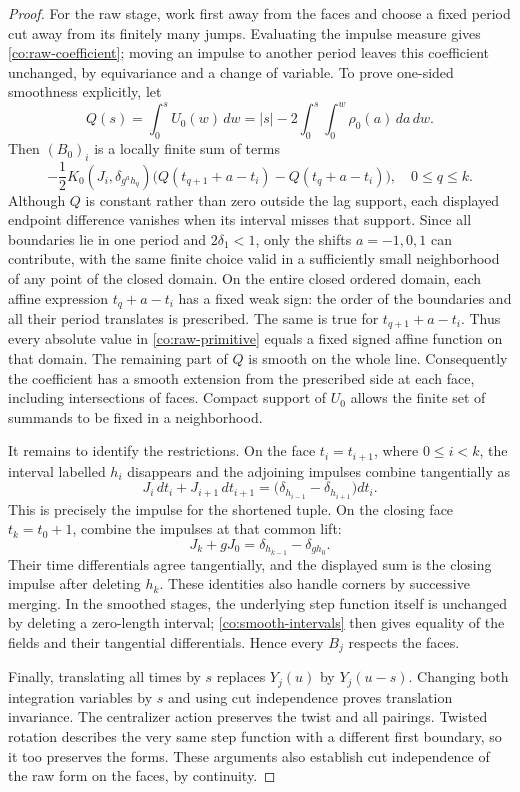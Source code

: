 \begin{proof}
For the raw stage, work first away from the faces and choose a fixed
period cut away from its finitely many jumps.  Evaluating the impulse
measure gives \eqref{co:raw-coefficient}; moving an impulse to another
period leaves this coefficient unchanged, by equivariance and a change
of variable.  To prove one-sided smoothness explicitly, let
\[
 Q(s)=\int_0^sU_0(w)\,dw
 =|s|-2\int_0^s\int_0^w\rho_0(a)\,da\,dw.
\]
Then $(B_0)_i$ is a locally finite sum of terms
\begin{equation}
 -\frac12K_0(J_i,\delta_{g^ah_q})
 \bigl(Q(t_{q+1}+a-t_i)-Q(t_q+a-t_i)\bigr),
 \quad 0\leq q\leq k.
 \label{co:raw-primitive}
\end{equation}
Although $Q$ is constant rather than zero outside the lag support, each
displayed endpoint difference vanishes when its interval misses that
support.  Since all boundaries lie in one period and $2\delta_1<1$, only
the shifts $a=-1,0,1$ can contribute, with the same finite choice valid
in a sufficiently small neighborhood of any point of the closed domain.
On the entire closed ordered domain, each affine expression
$t_q+a-t_i$ has a fixed weak sign: the order of the boundaries and all
their period translates is prescribed.  The same is true for
$t_{q+1}+a-t_i$.  Thus every absolute value in
\eqref{co:raw-primitive} equals a fixed signed affine function on that
domain.  The remaining part of $Q$ is smooth on the whole line.
Consequently the coefficient has a smooth extension from the prescribed
side at each face, including intersections of faces.  Compact support of
$U_0$ allows the finite set of summands to be fixed in a neighborhood.

It remains to identify the restrictions.  On the face $t_i=t_{i+1}$,
where $0\leq i<k$, the interval labelled $h_i$ disappears and the
adjoining impulses combine tangentially as
\[
 J_i\,dt_i+J_{i+1}\,dt_{i+1}
 =\bigl(\delta_{h_{i-1}}-\delta_{h_{i+1}}\bigr)dt_i.
\]
This is precisely the impulse for the shortened tuple.  On the closing
face $t_k=t_0+1$, combine the impulses at that common lift:
\[
 J_k+gJ_0
 =\delta_{h_{k-1}}-\delta_{gh_0}.
\]
Their time differentials agree tangentially, and the displayed sum is
the closing impulse after deleting $h_k$.  These identities also handle
corners by successive merging.  In the smoothed stages, the underlying
step function itself is unchanged by deleting a zero-length interval;
\eqref{co:smooth-intervals} then gives equality of the fields and their
tangential differentials.  Hence every $B_j$ respects the faces.

Finally, translating all times by $s$ replaces $Y_j(u)$ by $Y_j(u-s)$.
Changing both integration variables by $s$ and using cut independence
proves translation invariance.  The centralizer action preserves the
twist and all pairings.  Twisted rotation describes the very same step
function with a different first boundary, so it too preserves the
forms.  These arguments also establish cut independence of the raw form
on the faces, by continuity.
\end{proof}

